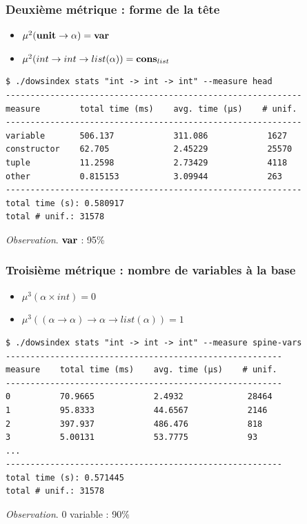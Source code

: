 \documentclass[serif]{beamer}
\newcommand{\unit}{\bold{unit}}
\begin{document}
\begin{frame}[fragile=singleslide]\frametitle{Deuxième métrique : forme de la tête}
\scriptsize
\begin{itemize}
	\item $\mu^2 (\unit \rightarrow \alpha) = \bold{var}$
	\item $\mu^2 (int \rightarrow int \rightarrow list (\alpha)) = \bold{cons}_{list}$
\end{itemize}
\begin{verbatim}
$ ./dowsindex stats "int -> int -> int" --measure head
------------------------------------------------------------
measure        total time (ms)    avg. time (µs)    # unif.
------------------------------------------------------------
variable       506.137            311.086            1627
constructor    62.705             2.45229            25570
tuple          11.2598            2.73429            4118
other          0.815153           3.09944            263
------------------------------------------------------------
total time (s): 0.580917
total # unif.: 31578
\end{verbatim}
\textit{Observation}. \sout{$\bold{var}$} : 95\%
\end{frame}


\begin{frame}[fragile=singleslide]\frametitle{Troisième métrique : nombre de variables à la base}
\scriptsize
\begin{itemize}
	\item $\mu^3 (\alpha \times int) = 0$
	\item $\mu^3 ((\alpha \rightarrow \alpha) \rightarrow \alpha \rightarrow list (\alpha)) = 1$
\end{itemize}
\begin{verbatim}
$ ./dowsindex stats "int -> int -> int" --measure spine-vars
--------------------------------------------------------
measure    total time (ms)    avg. time (µs)    # unif.
--------------------------------------------------------
0          70.9665            2.4932             28464
1          95.8333            44.6567            2146
2          397.937            486.476            818
3          5.00131            53.7775            93
...
--------------------------------------------------------
total time (s): 0.571445
total # unif.: 31578
\end{verbatim}
\textit{Observation}. 0 variable : 90\%
\end{frame}
\end{document}
